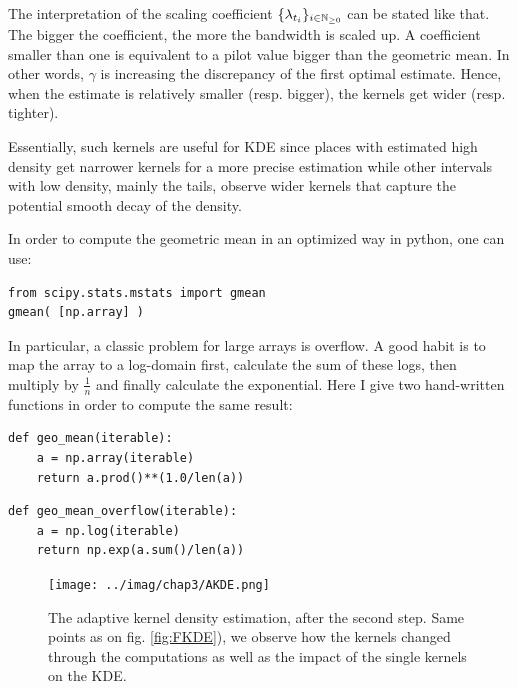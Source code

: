 \documentclass[11pt]{book}
\newcommand{\sequence}[1]{\{ #1 \}_{ i \in \N} }
\begin{document}
\begin{remarque}
The interpretation of the scaling coefficient $\sequence{\lambda_{t_i}}$ can be stated like that. The bigger the coefficient, the more the bandwidth is scaled up. A coefficient smaller than one is equivalent to a pilot value bigger than the geometric mean. In other words, $\gamma$ is increasing the discrepancy of the first optimal estimate. Hence, when the estimate is relatively smaller (resp. bigger), the kernels get wider (resp. tighter). 

Essentially, such kernels are useful for KDE since places with estimated high density get narrower kernels for a more precise estimation while other intervals with low density, mainly the tails, observe wider kernels that capture the potential smooth decay of the density. 
\end{remarque}



In order to compute the geometric mean in an optimized way in python, one can use:

\begin{verbatim}
from scipy.stats.mstats import gmean
gmean( [np.array] )
\end{verbatim}

In particular, a classic problem for large arrays is overflow. A good habit is to map the array to a log-domain first, calculate the sum of these logs, then multiply by $\frac 1 n$ and finally calculate the exponential. Here I give two hand-written functions in order to compute the same result:

\begin{verbatim}
def geo_mean(iterable):
    a = np.array(iterable)
    return a.prod()**(1.0/len(a))
\end{verbatim}    
\begin{verbatim}
def geo_mean_overflow(iterable):
    a = np.log(iterable)
    return np.exp(a.sum()/len(a))
\end{verbatim}



\begin{figure}
\centering
\texttt{[image: ../imag/chap3/AKDE.png]}
\caption{The adaptive kernel density estimation, after the second step. Same points as on fig. \ref{fig:FKDE}), we observe how the kernels changed through the computations as well as the impact of the single kernels on the KDE.}
\end{figure}
\end{document}
